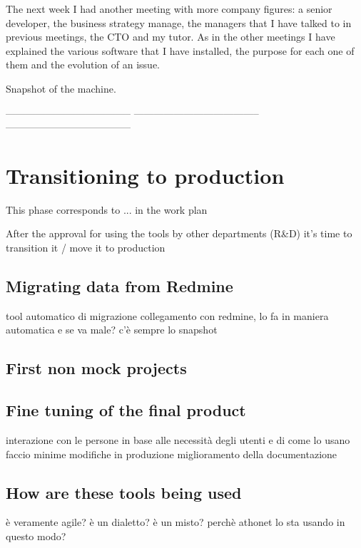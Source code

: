 	
	The next week I had another meeting with more company figures: a senior developer, the business strategy manage, the managers that I have talked to in previous meetings, the CTO and my tutor.
	As in the other meetings I have explained the various software that I have installed, the purpose for each one of them and the evolution of an issue.
	
	Snapshot of the machine.
	
	--------------------------------------	--------------------------------------	--------------------------------------

\section{Transitioning to production}

	This phase corresponds to ... in the work plan

	After the approval for using the tools by other departments (R\&D) it's time to transition it / move it to production
	
	\subsection{Migrating data from Redmine}
		tool automatico di migrazione
		collegamento con redmine, lo fa in maniera automatica
		e se va male? c'è sempre lo snapshot
	
	\subsection{First non mock projects}
	
	\subsection{Fine tuning of the final product}
		interazione con le persone
		in base alle necessità degli utenti e di come lo usano faccio minime modifiche in produzione
		miglioramento della documentazione
	
	\subsection{How are these tools being used}
		è veramente agile? 
		è un dialetto?
		è un misto?
		perchè athonet lo sta usando in questo modo?

